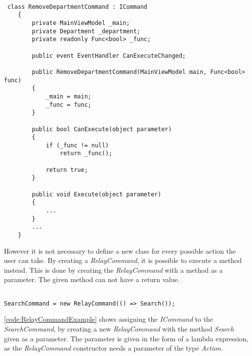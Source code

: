 \begin{listing}[H]
\begin{verbatim}

 class RemoveDepartmentCommand : ICommand
    {
        private MainViewModel _main;
        private Department _department;
        private readonly Func<bool> _func;

        public event EventHandler CanExecuteChanged;

        public RemoveDepartmentCommand(MainViewModel main, Func<bool> func)
        {
            _main = main;
            _func = func;
        }

        public bool CanExecute(object parameter)
        {
            if (_func != null)
                return _func();

            return true;
        }

        public void Execute(object parameter)
        {
            ...
        }
        ...
    }

\end{verbatim}
\label{code:RemoveDepartmentCommandExample}
\end{listing}

However it is not necessary to define a new class for every possible action the user can take. By creating a \textit{RelayCommand}, it is possible to execute a method instead. This is done by creating the \textit{RelayCommand} with a method as a parameter. The given method can not have a return value.
\\

\begin{listing}[H]
\begin{verbatim}

SearchCommand = new RelayCommand(() => Search());

\end{verbatim}
\label{code:RelayCommandExample}
\end{listing}

\autoref{code:RelayCommandExample} shows assigning the \textit{ICommand} to the \textit{SearchCommand}, by creating a new \textit{RelayCommand} with the method \textit{Search} given as a parameter. The parameter is given in the form of a lambda expression, as the \textit{RelayCommand} constructor needs a parameter of the type \textit{Action}. \par

